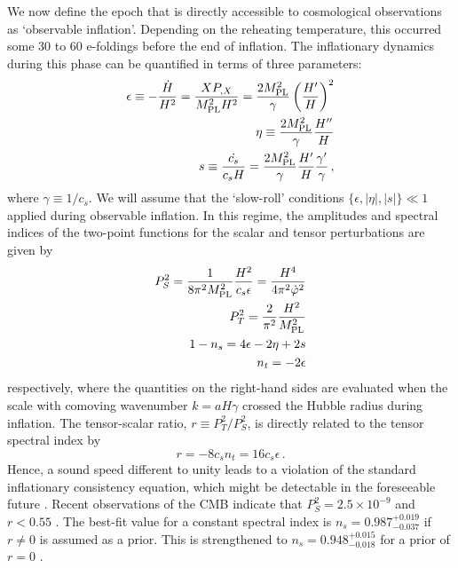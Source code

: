 We now define the epoch that is directly 
accessible to cosmological observations as `observable inflation'. 
Depending on the reheating 
temperature, this occurred some 30 to 60 e-foldings before the end of 
inflation. The inflationary dynamics during this phase can  
be quantified in terms of three parameters: 
% 
\begin{eqnarray}
\label{eq:epsdefn-dbiintro}
\epsilon \equiv -\frac{\dot{H}}{H^2}
= \frac{XP_{,X}}{M_{\mathrm{PL}}^2H^2} 
= \frac{2M_{\mathrm{PL}}^2}{\gamma} \left( \frac{H'}{H} \right)^2 \\
\label{defeta}
\eta \equiv  \frac{2M_{\mathrm{PL}}^2}{\gamma}\frac{H''}{H} \\
\label{defs}
s \equiv \frac{\dot{c_s}}{c_sH} 
= \frac{2M_{\mathrm{PL}}^2}{\gamma} \frac{H'}{H}\frac{\gamma'}{\gamma}  \,,
\end{eqnarray}
% 
where $\gamma \equiv 1/c_s$. 
We will assume that the `slow-roll' conditions 
$\{ \epsilon, |\eta | , |s | \}  \ll 1$ applied during observable inflation. 
In this regime, the amplitudes and spectral indices of the two-point functions 
for the scalar and tensor perturbations are given by \cite{gm}
% 
\begin{eqnarray}
\label{eq:spectra-dbiintro}
P_S^2= \frac{1}{8 \pi^2 M_{\mathrm{PL}}^2} \frac{H^2}{c_s \epsilon}
= \frac{H^4}{4\pi^2\dot{\varphi}^2}
\\
P_T^2 = \frac{2}{\pi^2} \frac{H^2}{M_{\mathrm{PL}}^2} 
\\
\label{indices}
1-n_s = 4 \epsilon -2\eta  +2s 
\\
 n_t = -2\epsilon  
\end{eqnarray}
% 
respectively, where the quantities on the right-hand sides are evaluated 
when the scale with comoving wavenumber $k=aH\gamma$ crossed 
the Hubble radius during inflation.  
The tensor-scalar ratio, $r \equiv P_T^2/P_S^2$, is directly related to 
the tensor spectral index by \cite{gm}
% 
\begin{equation}
\label{eq:consistency-dbiintro}
r= -8c_sn_t = 16c_s \epsilon\,.
\end{equation}
% 
Hence, a sound speed different to unity leads to a violation of the 
standard inflationary consistency equation, which might be 
detectable in the foreseeable future \cite{lidser1,lidser2}. 
Recent observations of the CMB 
indicate that $P^2_S=2.5 \times 10^{-9}$ and $r < 0.55$ \cite{spergel}. 
The best-fit value for a constant spectral index is 
$n_s = 0.987^{+0.019}_{-0.037}$ if $r\ne 0$ is assumed as a prior. 
This is strengthened to 
$n_s = 0.948^{+0.015}_{-0.018}$ for a prior of $r = 0$ \cite{spergel}. 


